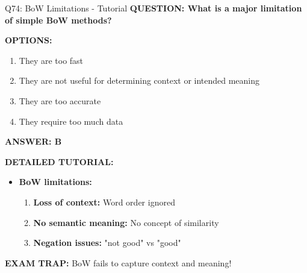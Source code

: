 \documentclass[8pt]{beamer}
\begin{document}
	\begin{frame}{Q74: BoW Limitations - Tutorial}
		\fontsize{6.5}{7.5}\selectfont
		\textbf{QUESTION: What is a major limitation of simple BoW methods?}
		
		\vspace{0.1cm}
		\textbf{OPTIONS:}
		\begin{enumerate}
			\item They are too fast
			\item They are not useful for determining context or intended meaning
			\item They are too accurate
			\item They require too much data
		\end{enumerate}
		
		\vspace{0.1cm}
		\textcolor{myblue}{\textbf{ANSWER: B}}
		
		\vspace{0.1cm}
		\textbf{DETAILED TUTORIAL:}
		\begin{itemize}
			\item \textbf{BoW limitations:}
			\begin{enumerate}
				\item \textbf{Loss of context:} Word order ignored
				\item \textbf{No semantic meaning:} No concept of similarity
				\item \textbf{Negation issues:} "not good" vs "good"
			\end{enumerate}
		\end{itemize}
		
		\textcolor{myred}{\textbf{EXAM TRAP:}} BoW fails to capture \textcolor{myblue}{context and meaning}!
	\end{frame}
	
\end{document}
